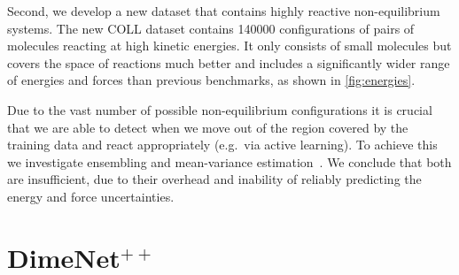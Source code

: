 \documentclass{article}
\begin{document}
Second, we develop a new dataset that contains highly reactive non-equilibrium systems. The new \textsc{COLL} dataset contains \num{140000} configurations of pairs of molecules reacting at high kinetic energies. It only consists of small molecules but covers the space of reactions much better and includes a significantly wider range of energies and forces than previous benchmarks, as shown in \cref{fig:energies}.

Due to the vast number of possible non-equilibrium configurations it is crucial that we are able to detect when we move out of the region covered by the training data and react appropriately (e.g.\ via active learning). To achieve this we investigate ensembling \cite{hansen_neural_1990} and mean-variance estimation~\cite{nix_estimating_1994}. We conclude that both are insufficient, due to their overhead and inability of reliably predicting the energy and force uncertainties.

\section{DimeNet$^{++}$}
\end{document}
